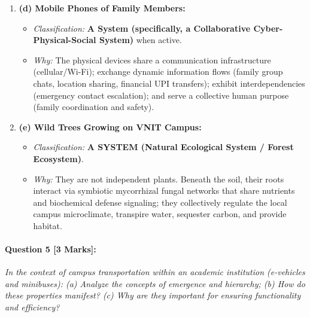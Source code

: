 \begin{tcolorbox}[colback=white,colframe=seSecondary,title={\small \textbf{Model Solution for Q4 (W24 Midsem):}}]
\begin{enumerate}[leftmargin=1.5em, itemsep=4pt]
\begin{itemize}[itemsep=1pt]
        \item \textit{Additions to make unambiguously a System:} Introduce the \textbf{Human-Technical Process}: the artist (actor), canvas, palette, chemical solvents, lighting, and procedural workflows that transform raw pigments into visual artwork to convey meaning (Function).
    \end{itemize}
    \item \textbf{(d) Mobile Phones of Family Members:}
    \begin{itemize}[itemsep=1pt]
        \item \textit{Classification:} \textbf{A System (specifically, a Collaborative Cyber-Physical-Social System)} when active.
        \item \textit{Why:} The physical devices share a communication infrastructure (cellular/Wi-Fi); exchange dynamic information flows (family group chats, location sharing, financial UPI transfers); exhibit interdependencies (emergency contact escalation); and serve a collective human purpose (family coordination and safety).
    \end{itemize}
    \item \textbf{(e) Wild Trees Growing on VNIT Campus:}
    \begin{itemize}[itemsep=1pt]
        \item \textit{Classification:} \textbf{A SYSTEM (Natural Ecological System / Forest Ecosystem)}.
        \item \textit{Why:} They are not independent plants. Beneath the soil, their roots interact via symbiotic mycorrhizal fungal networks that share nutrients and biochemical defense signaling; they collectively regulate the local campus microclimate, transpire water, sequester carbon, and provide habitat.
    \end{itemize}
\end{enumerate}
\end{tcolorbox}

\vspace{0.8em}
\paragraph{Question 5 [3 Marks]:}
\textit{In the context of campus transportation within an academic institution (e-vehicles and minibuses): (a) Analyze the concepts of emergence and hierarchy; (b) How do these properties manifest? (c) Why are they important for ensuring functionality and efficiency?}


